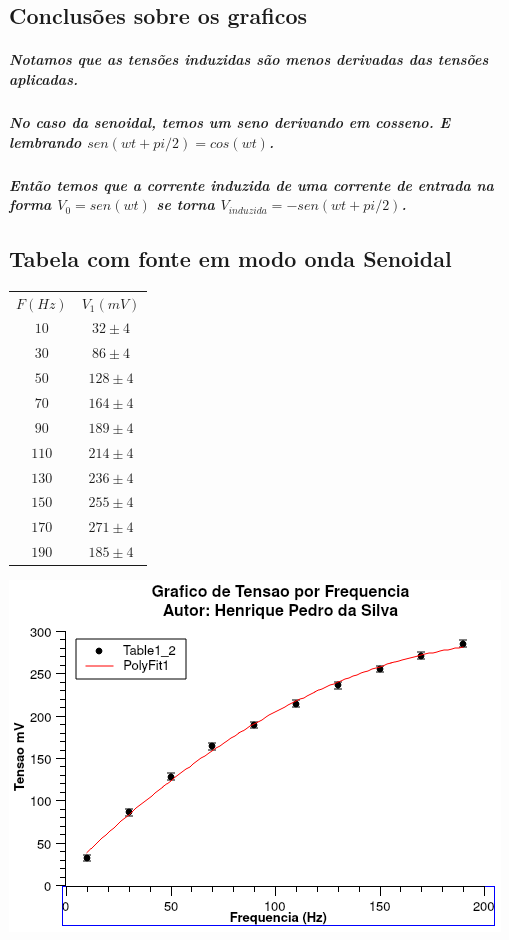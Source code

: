 \documentclass[12pt,twoside, a4paper, twocolumn]{article}
\begin{document}
\subsection{Conclusões sobre os graficos}

\subparagraph*{Notamos que as tensões induzidas são menos derivadas das tensões aplicadas.}

\subparagraph*{No caso da senoidal, temos um seno derivando em cosseno. E lembrando $sen(wt+pi/2) = cos(wt)$.}

\subparagraph*{Então temos que a corrente induzida de uma corrente de entrada na forma $V_0 = sen(wt)$ se torna $V_{induzida} = -sen(wt+pi/2)$.}

\subsection{Tabela com fonte em modo onda Senoidal}

\begin{center}
  \begin{tabular}{ |cc| }
    \hline
    $F (Hz)$ & $ V_1 (mV)$ \\
    $10$     & $32 \pm 4$  \\
    $30$     & $86 \pm 4$  \\
    $50$     & $128 \pm 4$ \\
    $70$     & $164 \pm 4$ \\
    $90$     & $189 \pm 4$ \\
    $110$    & $214 \pm 4$ \\
    $130$    & $236 \pm 4$ \\
    $150$    & $255 \pm 4$ \\
    $170$    & $271 \pm 4$ \\
    $190$    & $185 \pm 4$ \\

    \hline
  \end{tabular}
\end{center}

\begin{adjustbox}{scale=0.70}
  \includegraphics{Graph1.png}
\end{adjustbox}
\end{document}
